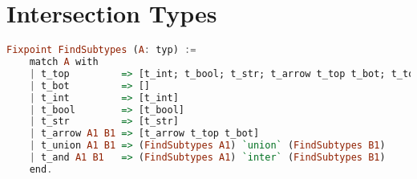 \section{Intersection Types}
\label{sec:intersection}


\begin{comment}

\begin{align*}
&Type &A, B&::= [[Top]] ~ | ~[[Bot]]~|~ Int ~| ~ Bool ~ |~ Str ~| ~ [[A->B]]~ |~ [[A \/ B]] ~ |~ [[A /\ B]]\\
&Expr &e &::= x ~|~ n ~| ~ b ~ | ~ s ~| ~ e:A ~|~[[\x.e]] ~ | ~ e1e2 ~|~ [[typeof e as A e1 B e2]]\\
&PExpr & p &::= n ~| ~ b ~ | ~ s ~|~ [[\x.e : A->B]] \\
&Value &v &::= p : A \\
&Context & [[G]] &::= empty~ |~ [[G , x : A]]
\end{align*}

     {\renewcommand{\arraystretch}{1.5}
     \begin{center}
     \begin{tabular}{|lcll|}
       \hline
      DisjSpec & A $*_s$ B & ::= & ~$\forall C, ~ Ord ~ C ~ \rightarrow \neg [[C <: A /\ B]]$\\
       \hline
      DisjAlgo & A $*_a$ B & ::= & ~ $(FindSubtypes ~ A) ~ `inter` ~ (FindSubtypes ~ B) = []$ \\
       \hline
     \end{tabular}
     \end{center} }
\end{comment}

\begin{lstlisting}[language=Haskell]
Fixpoint FindSubtypes (A: typ) :=
    match A with
    | t_top         => [t_int; t_bool; t_str; t_arrow t_top t_bot; t_top]
    | t_bot         => []
    | t_int         => [t_int]
    | t_bool        => [t_bool]
    | t_str         => [t_str]
    | t_arrow A1 B1 => [t_arrow t_top t_bot]
    | t_union A1 B1 => (FindSubtypes A1) `union` (FindSubtypes B1)
    | t_and A1 B1   => (FindSubtypes A1) `inter` (FindSubtypes B1)
    end.
\end{lstlisting}
